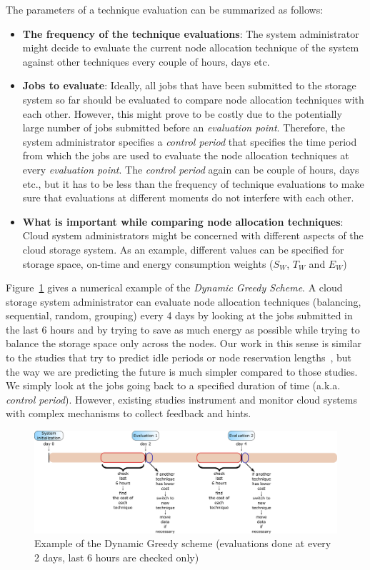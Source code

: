 \documentclass[preprint,12pt]{elsarticle}
\begin{document}
The parameters of a technique evaluation can be summarized as follows:
\begin{itemize}
\item \textbf{The frequency of the technique evaluations}: The system administrator might decide to
evaluate the current node allocation technique of the system against other techniques every couple of
hours, days etc.
\item \textbf{Jobs to evaluate}: Ideally, all jobs that have been submitted to the storage system so far
should be evaluated to compare node allocation techniques with each other. However, this might prove to be costly due
to the potentially large number of jobs submitted before an \textit{evaluation point}. Therefore, the system
administrator specifies a \textit{control period} that specifies the
time period from which the jobs are used to evaluate the node
allocation techniques at every \textit{evaluation point}.
The \textit{control period} again can be couple of hours, days etc., but it has to be less than the frequency of
technique evaluations to make sure that evaluations at different moments do not interfere with each other.
\item \textbf{What is important while comparing node allocation techniques}: Cloud system administrators might be
concerned with different aspects of the cloud storage system. As an example, different values can be specified for
storage space, on-time and energy consumption weights ($S_W$, $T_W$ and $E_W$)
\end{itemize}

Figure~\ref{greedy_examples} gives a numerical example of
the \textit{Dynamic Greedy Scheme}.
A cloud storage system administrator can evaluate node allocation techniques (balancing, sequential, random,
grouping) every 4 days by looking at the jobs submitted in the last 6 hours and by trying to save as much energy
as possible while trying to balance the storage space only across the nodes. Our work in this sense is similar
to the studies that try to predict idle periods or node reservation lengths~\cite{4724317, Riska:2010:FRE:1710115.1710124},
but the way we are predicting the future is much simpler compared to those studies. We simply look at the jobs
going back to a specified duration of time (a.k.a. \textit{control period}). However, existing studies instrument
and monitor cloud systems with complex mechanisms to collect feedback and hints.

\begin{figure}[!htbp]
\centering
\includegraphics[width=\columnwidth,keepaspectratio]{FIG3.pdf}
\caption{Example of the Dynamic Greedy scheme (evaluations done at every 2 days, last 6 hours are checked only)}
\label{greedy_examples}
\end{figure}
\end{document}
